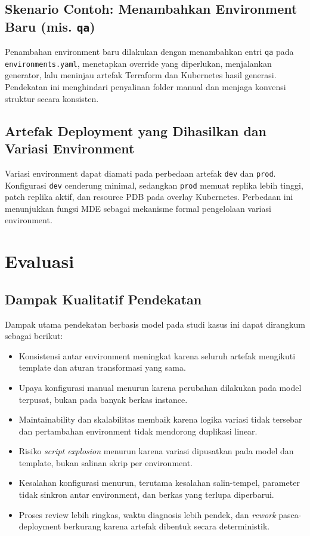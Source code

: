 \subsection[Skenario Contoh]{Skenario Contoh: Menambahkan Environment Baru (mis. \texttt{qa})}\label{subsec:mde-skenario-qa}

Penambahan environment baru dilakukan dengan menambahkan entri \texttt{qa} pada \texttt{environments.yaml}, menetapkan override yang diperlukan, menjalankan generator, lalu meninjau artefak Terraform dan Kubernetes hasil generasi. Pendekatan ini menghindari penyalinan folder manual dan menjaga konvensi struktur secara konsisten.

\subsection[Artefak Deployment yang Dihasilkan]{Artefak Deployment yang Dihasilkan dan Variasi Environment}\label{subsec:mde-variasi-environment}

Variasi environment dapat diamati pada perbedaan artefak \texttt{dev} dan \texttt{prod}. Konfigurasi \texttt{dev} cenderung minimal, sedangkan \texttt{prod} memuat replika lebih tinggi, patch replika aktif, dan resource PDB pada overlay Kubernetes. Perbedaan ini menunjukkan fungsi MDE sebagai mekanisme formal pengelolaan variasi environment.

\section{Evaluasi}\label{sec:mde-evaluasi}

\subsection[Dampak Kualitatif Pendekatansubsec]{Dampak Kualitatif Pendekatan}\label{subsec:mde-dampak-kualitatif}

Dampak utama pendekatan berbasis model pada studi kasus ini dapat dirangkum sebagai berikut:
\begin{itemize}
    \item Konsistensi antar environment meningkat karena seluruh artefak mengikuti template dan aturan transformasi yang sama.
    \item Upaya konfigurasi manual menurun karena perubahan dilakukan pada model terpusat, bukan pada banyak berkas instance.
    \item Maintainability dan skalabilitas membaik karena logika variasi tidak tersebar dan pertambahan environment tidak mendorong duplikasi linear.
    \item Risiko \textit{script explosion} menurun karena variasi dipusatkan pada model dan template, bukan salinan skrip per environment.
    \item Kesalahan konfigurasi menurun, terutama kesalahan salin-tempel, parameter tidak sinkron antar environment, dan berkas yang terlupa diperbarui.
    \item Proses review lebih ringkas, waktu diagnosis lebih pendek, dan \textit{rework} pasca-deployment berkurang karena artefak dibentuk secara deterministik.
\end{itemize}

